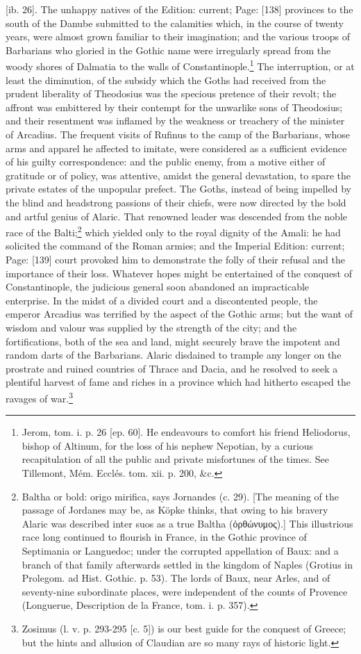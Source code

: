 {[ib. 26].} The unhappy natives of the Edition: current; Page: [138] provinces to the south of the Danube submitted to the calamities which, in the course of twenty years, were almost grown familiar to their imagination; and the various troops of Barbarians who gloried in the Gothic name were irregularly spread from the woody shores of Dalmatia to the walls of Constantinople.\footnote{Jerom, tom. i. p. 26 [ep. 60]. He endeavours to comfort his friend Heliodorus, bishop of Altinum, for the loss of his nephew Nepotian, by a curious recapitulation of all the public and private misfortunes of the times. See Tillemont, Mém. Ecclés. tom. xii. p. 200, \&c.} The interruption, or at least the diminution, of the subsidy which the Goths had received from the prudent liberality of Theodosius was the specious pretence of their revolt; the affront was embittered by their contempt for the unwarlike sons of Theodosius; and their resentment was inflamed by the weakness or treachery of the minister of Arcadius. The frequent visits of Rufinus to the camp of the Barbarians, whose arms and apparel he affected to imitate, were considered as a sufficient evidence of his guilty correspondence: and the public enemy, from a motive either of gratitude or of policy, was attentive, amidst the general devastation, to spare the private estates of the unpopular prefect. The Goths, instead of being impelled by the blind and headstrong passions of their chiefs, were now directed by the bold and artful genius of Alaric. That renowned leader was descended from the noble race of the Balti;\footnote{Baltha or bold: origo mirifica, says Jornandes (c. 29). [The meaning of the passage of Jordanes may be, as Köpke thinks, that owing to his bravery Alaric was described inter suos as a true Baltha (\textgreek{\texthebrew{ὀ}ρθώνυμος}).] This illustrious race long continued to flourish in France, in the Gothic province of Septimania or Languedoc; under the corrupted appellation of Baux: and a branch of that family afterwards settled in the kingdom of Naples (Grotius in Prolegom. ad Hist. Gothic. p. 53). The lords of Baux, near Arles, and of seventy-nine subordinate places, were independent of the counts of Provence (Longuerue, Description de la France, tom. i. p. 357).} which yielded only to the royal dignity of the Amali: he had solicited the command of the Roman armies; and the Imperial Edition: current; Page: [139] court provoked him to demonstrate the folly of their refusal and the importance of their loss. Whatever hopes might be entertained of the conquest of Constantinople, the judicious general soon abandoned an impracticable enterprise. In the midst of a divided court and a discontented people, the emperor Arcadius was terrified by the aspect of the Gothic arms; but the want of wisdom and valour was supplied by the strength of the city; and the fortifications, both of the sea and land, might securely brave the impotent and random darts of the Barbarians. Alaric disdained to trample any longer on the prostrate and ruined countries of Thrace and Dacia, and he resolved to seek a plentiful harvest of fame and riches in a province which had hitherto escaped the ravages of war.\footnote{Zosimus (l. v. p. 293-295 [c. 5]) is our best guide for the conquest of Greece; but the hints and allusion of Claudian are so many rays of historic light.}

